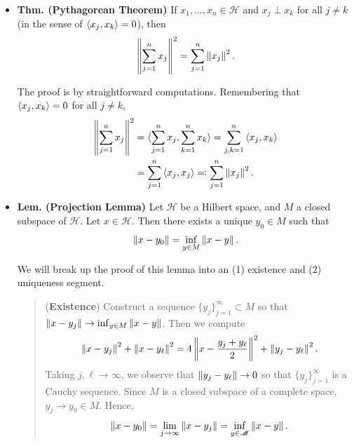 \documentclass{article}
\begin{document}
\begin{itemize}
	\item \textbf{Thm. (Pythagorean Theorem)} If $x_{1}, \ldots, x_{n} \in \mathscr{H}$ and $x_{j} \perp x_{k}$ for all $j \neq k$ (in the sense of $\braket{x_{j}, x_{k}} = 0$), then 
		\begin{equation*}
			\left\Vert \sum_{j= 1}^{n}x_{j} \right\Vert^{2} = \sum_{j = 1}^{n}\left\Vert x_{j} \right\Vert^{2}. 
		\end{equation*}
	\begin{solutions}
		The proof is by straightforward computations. Remembering that $\braket{x_{j}, x_{k}} = 0$ for all $j \neq k$, 
			\begin{align}
				\begin{split}
					\left\Vert \sum_{j =1}^{n}x_{j} \right\Vert^{2} &= \braket{\sum_{j = 1}^{n}x_{j}, \sum_{k = 1}^{n}x_{k}} = \sum_{j,k = 1}^{n}\braket{x_{j}, x_{k}} \\
					&= \sum_{j = 1}^{n}\braket{x_{j},x_{j}} \eqqcolon \sum_{j = 1}^{n}\left\Vert x_{j} \right\Vert^{2}. 
				\end{split}
			\end{align}
	\end{solutions}
	\item \textbf{Lem. (Projection Lemma)} Let $\mathscr{H}$ be a Hilbert space, and $M$ a closed subspace of $\mathscr{H}$. Let $x \in \mathscr{H}$. Then there exists a unique $y_{0} \in M$ such that 
		\begin{equation*}
			\left\Vert x - y_{0} \right\Vert = \inf_{y \in M}\left\Vert x - y \right\Vert. 
		\end{equation*}
	\begin{solutions}
		We will break up the proof of this lemma into an (1) existence and (2) uniqueness segment. 
			\begin{quote}
				(\textbf{Existence}) Construct a sequence $\{y_{j}\}_{j = 1}^{\infty} \subset M$ so that $\left\Vert x - y_{j} \right\Vert \to \inf_{y \in M}\left\Vert x - y \right\Vert$. Then we compute 
					\begin{align}
						\begin{split}
							\left\Vert x - y_{j} \right\Vert^{2} + \left\Vert x - y_{\ell} \right\Vert^{2} = 4 \left\Vert  x- \frac{y_{j} + y_{\ell}}{2} \right\Vert^{2} + \left\Vert y_{j} - y_{\ell} \right\Vert^{2}. 
						\end{split}
					\end{align}
				Taking $j, \ell \to \infty$, we observe that $\left\Vert y_{j} - y_{\ell} \right\Vert \to 0$ so that $\{y_{j}\}_{j = 1}^{\infty}$ is a Cauchy sequence. Since $M$ is a closed subspace of a complete space, $y_{j} \to y_{0} \in M$. Hence, 
					\begin{equation}
						\norm{x - y_{0}} = \lim_{j \to \infty}\norm{x - y_{j}} = \inf_{y \in \mathscr{M}}\norm{x - y}. 

\end{equation}
\end{quote}
\end{solutions}
\end{itemize}
\end{document}

